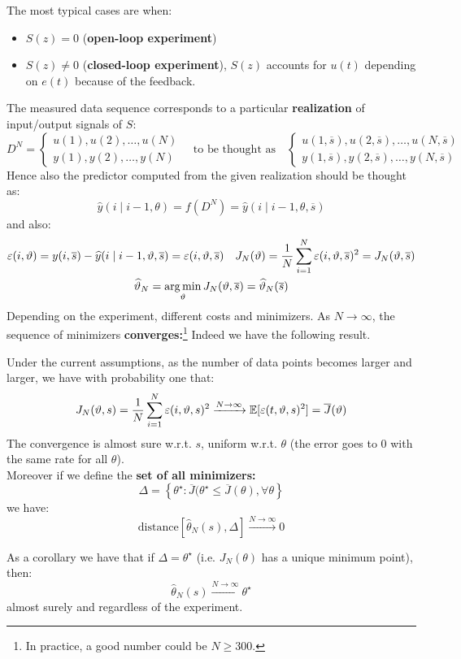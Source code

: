 The most typical cases are when:
\begin{itemize}
	\item $S(z)=0$ (\textbf{open-loop experiment})
	\item $S(z)\neq 0$ (\textbf{closed-loop experiment}), $S(z)$ accounts for $u(t)$ depending on $e(t)$ because of the feedback.
\end{itemize}
The measured data sequence corresponds to a particular \textbf{realization} of input/output signals of $S$:
\[
	D^{N}=
	\begin{cases}
	 	u(1),u(2),\ldots,u(N)\\
	 	y(1),y(2),\ldots,y(N)
	\end{cases}
	\quad
	\text{to be thought as}
	\quad
	\begin{cases}
	 	u(1,\overline{s}),u(2,\overline{s}),\ldots,u(N,\overline{s})\\
	 	y(1,\overline{s}),y(2,\overline{s}),\ldots,y(N,\overline{s})
	\end{cases}
\]
Hence also the predictor computed from the given realization should be thought as:
\[
	\hat{y}(i\mid i-1,\theta) = f(D^{N}) = \hat{y}(i\mid i-1,\theta,\overline{s})
\]
and also:
\begin{gather*}
	\varepsilon(i,\vartheta) = y(i,\overline{s}) - \widehat{y}(i\mid i-1,\vartheta,\overline{s}) = \varepsilon(i,\vartheta,\overline{s})
	\quad
	J_{N}(\vartheta) = \frac{1}{N}\sum_{i=1}^{N} \varepsilon(i,\vartheta,\overline{s})^2 = J_{N}(\vartheta,\overline{s})\\
	\widehat{\vartheta}_{N} = \operatorname*{arg\,min}_{\vartheta} J_{N}(\vartheta,\overline{s}) = \widehat{\vartheta}_{N}(\overline{s})
\end{gather*}
Depending on the experiment, different costs and minimizers. As $N\to \infty$, the sequence of minimizers \textbf{converges:}\footnote{In practice, a good number could be $N\geq 300$.}
Indeed we have the following result.
\begin{theorem}
	Under the current assumptions, as the number of data points becomes larger and larger, we have with probability one that:
	\[
		J_{N}(\vartheta,s) = \frac{1}{N}\sum_{i=1}^{N} \varepsilon(i,\vartheta,s)^2 \xrightarrow{N\to\infty} \mathbb{E}[\varepsilon(t,\vartheta,s)^2] = \overline{J}(\vartheta)
	\]
	The convergence is almost sure w.r.t. $s$, uniform w.r.t. $\theta$ (the error goes to $0$ with the same rate for all $\theta$).\\
	Moreover if we define the \textbf{set of all minimizers:}
	\[
		\Delta = \left\{ \theta ^{\star} : \overline{J}(\theta ^{\star}\le \overline{J}(\theta),\forall \theta  \right\}
	\]
	we have:
	\[
		\text{distance}[\hat{\theta}_{N}(s), \Delta]\xrightarrow{N\to\infty} 0
	\]
\end{theorem}
As a corollary we have that if $\Delta ={\theta ^{\star} }$ (i.e. $J_{N}(\theta)$ has a unique minimum point), then:
\[
	\hat{\theta}_{N}(s) \xrightarrow{N\to\infty} \theta ^{\star} 
\]
almost surely and regardless of the experiment.

